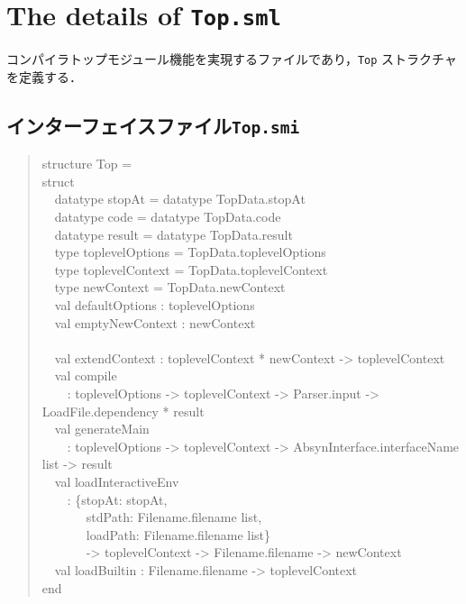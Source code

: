 \documentclass{jbook}
\newif\ifjp
\newcommand{\txt}[2]{#2}
\newcommand{\code}[1]{\mbox{\large\tt #1}}
\newcommand{\myem}{\mbox{\ \ }}
\newenvironment{program}{\begin{quote}\begin{tt}}%
                        {\end{tt}\end{quote}}
\begin{document}
\section{\txt{\code{Top.sml}の処理の詳細}{The details of \code{Top.sml}}}
\ifjp%

	コンパイラトップモジュール機能を実現するファイルであり，\code{Top}
ストラクチャを定義する．

\subsection{インターフェイスファイル\code{Top.smi}}
\begin{program}
structure Top =\\
struct\\
\myem   datatype stopAt = datatype TopData.stopAt\\
\myem   datatype code = datatype TopData.code\\
\myem   datatype result = datatype TopData.result\\
\myem   type toplevelOptions = TopData.toplevelOptions\\
\myem   type toplevelContext = TopData.toplevelContext\\
\myem   type newContext = TopData.newContext\\
\myem   val defaultOptions : toplevelOptions\\
\myem   val emptyNewContext : newContext\\
\\
\myem   val extendContext : toplevelContext * newContext -> toplevelContext\\
\myem   val compile \\
\myem\myem       : toplevelOptions -> toplevelContext -> Parser.input -> LoadFile.dependency * result\\
\myem   val generateMain\\
\myem\myem       : toplevelOptions -> toplevelContext -> AbsynInterface.interfaceName list -> result\\
\myem   val loadInteractiveEnv \\
\myem\myem       : \{stopAt: stopAt,\\
\myem\myem\myem\           stdPath: Filename.filename list,\\
\myem\myem\myem\          loadPath: Filename.filename list\}\\
\myem\myem\myem\          -> toplevelContext -> Filename.filename -> newContext\\
\myem   val loadBuiltin : Filename.filename -> toplevelContext\\
end
\end{program}
\end{document}
